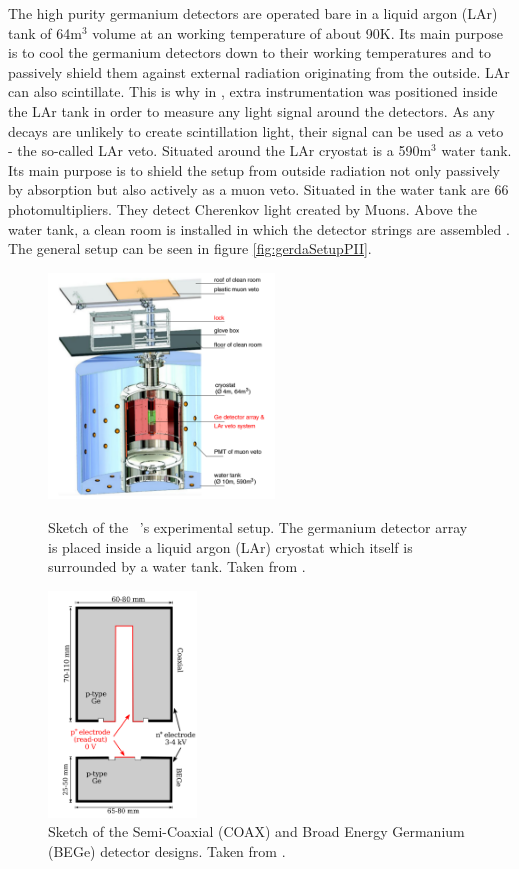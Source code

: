 \documentclass[encoding=utf8,british]{tumphthesis}
\begin{document}
The high purity germanium detectors are operated bare in a liquid argon (LAr) tank of 64m$^3$ volume at an working temperature of about 90K.
Its main purpose is to cool the germanium detectors down to their working temperatures and to passively shield them against external radiation originating from the outside.
LAr can also scintillate.
This is why in \PII, extra instrumentation was positioned inside the LAr tank in order to measure any light signal around the detectors.
As any  decays are unlikely to create scintillation light, their signal can be used as a veto - the so-called LAr veto.
Situated around the LAr cryostat is a 590m$^3$ water tank.
Its main purpose is to shield the setup from outside radiation not only passively by absorption but also actively as a muon veto.
Situated in the water tank are 66 photomultipliers.
They detect Cherenkov light created by Muons.
Above the water tank, a clean room is installed in which the detector strings are assembled  \cite{agostini_background_2017}.  
The general setup can be seen in figure \ref{fig:gerdaSetupPII}.
\\

\begin{figure}[t!]
	\centering
	\begin{minipage}[t!]{.45\textwidth}
		\centering
		\includegraphics[height=60mm]{./Bilder/GERDAsetupPhaseII.png}
		\caption{Sketch of the \gerda\ \PII's experimental setup. The germanium detector array is placed inside a liquid argon (LAr) cryostat which itself is surrounded by a water tank. Taken from \cite{collaboration_upgrade_2018}.}
		\label{fig:gerdaSetupPII}
	\end{minipage}\hfill%
	\begin{minipage}[t!]{.45\textwidth}
		\centering
		\includegraphics[height=60mm]{./Bilder/DetectorDesign.png}
		\caption{Sketch of the Semi-Coaxial (COAX) and Broad Energy Germanium (BEGe) detector designs. Taken from \cite{agostini_background_2014}.}
		\label{fig:DetcDes}
	\end{minipage}
\end{figure}
\end{document}
